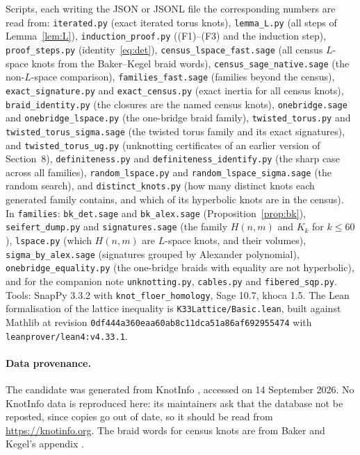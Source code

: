 \documentclass[11pt]{article}
\theoremstyle{definition}
\begin{document}
Scripts, each writing the JSON or JSONL file the corresponding numbers are read from:
\texttt{iterated.py} (exact iterated torus knots), \texttt{lemma\_L.py} (all steps of Lemma~\ref{lem:L}),
\texttt{induction\_proof.py} ((F1)--(F3) and the induction step), \texttt{proof\_steps.py} (identity~\eqref{eq:det}),
\texttt{census\_lspace\_fast.sage} (all census $L$-space knots from the Baker--Kegel braid words),
\texttt{census\_sage\_native.sage} (the non-$L$-space comparison), \texttt{families\_fast.sage} (families beyond the
census), \texttt{exact\_signature.py} and \texttt{exact\_census.py} (exact inertia for all census knots),
\texttt{braid\_identity.py} (the closures are the named census knots), \texttt{onebridge.sage} and
\texttt{onebridge\_lspace.py} (the one-bridge braid family), \texttt{twisted\_torus.py} and
\texttt{twisted\_torus\_sigma.sage} (the twisted torus family and its exact signatures), and
\texttt{twisted\_torus\_ug.py} (unknotting certificates of an earlier version of Section~8), \texttt{definiteness.py} and
\texttt{definiteness\_identify.py} (the sharp case across all families), \texttt{random\_lspace.py} and
\texttt{random\_lspace\_sigma.sage} (the random search), and \texttt{distinct\_knots.py} (how many distinct knots each
generated family contains, and which of its hyperbolic knots are in the census). In \texttt{families}: \texttt{bk\_det.sage} and
\texttt{bk\_alex.sage} (Proposition~\ref{prop:bk}), \texttt{seifert\_dump.py} and \texttt{signatures.sage} (the family
$H(n,m)$ and $K_k$ for $k \le 60$), \texttt{lspace.py} (which $H(n,m)$ are $L$-space knots, and their volumes),
\texttt{sigma\_by\_alex.sage} (signatures grouped by Alexander polynomial), \texttt{onebridge\_equality.py} (the one-bridge braids with
equality are not hyperbolic), and for the companion note
\texttt{unknotting.py}, \texttt{cables.py} and \texttt{fibered\_sqp.py}.
Tools: SnapPy 3.3.2 with \texttt{knot\_floer\_homology}, Sage 10.7, khoca 1.5. The Lean formalisation of the
lattice inequality is \texttt{K33Lattice/Basic.lean}, built against Mathlib at revision
\texttt{0df444a360eaa60ab8c11dca51a86af692955474} with \texttt{leanprover/lean4:v4.33.1}.

\paragraph{Data provenance.} The candidate was generated from KnotInfo \cite{KnotInfo}, accessed on 14 September 2026.
No KnotInfo data is reproduced here: its maintainers ask that the database not be reposted, since copies go out
of date, so it should be read from \url{https://knotinfo.org}. The braid words for census knots are from Baker and
Kegel's appendix \cite{BK}.
\end{document}
